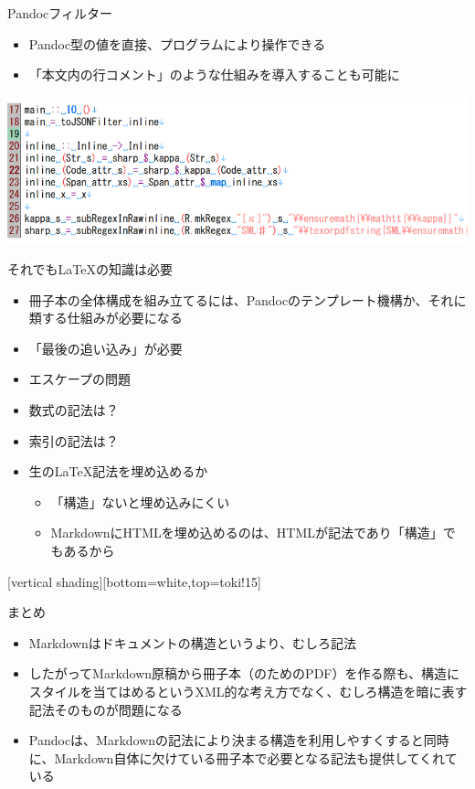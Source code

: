 \documentclass[14pt,dvipdfmx,uplatex]{beamer}
\begin{document}
\begin{frame}[t]{\inhibitglue Pandocフィルター}
  \sffamily
  \begin{itemize}
    \item Pandoc型の値を直接、プログラムにより操作できる
    \item \leavevmode\inhibitglue 「本文内の行コメント」のような仕組みを導入することも可能に
  \end{itemize}
  \begin{center}
  \includegraphics[width=.9\textwidth]{figures/filter.png}\\
  \end{center}
\end{frame}

\begin{frame}[t]{\inhibitglue それでも\LaTeX{}の知識は必要}
  \sffamily
  \begin{itemize}
    \item 冊子本の全体構成を組み立てるには、Pandocのテンプレート機構か、それに類する仕組みが必要になる
    \item \leavevmode\inhibitglue 「最後の追い込み」が必要
    \item エスケープの問題
    \item 数式の記法は？
    \item 索引の記法は？
    \item 生の\LaTeX{}記法を埋め込めるか
    \begin{itemize}
      \item 「構造」ないと埋め込みにくい
      \item MarkdownにHTMLを埋め込めるのは、HTMLが記法であり「構造」でもあるから
    \end{itemize}
  \end{itemize}
\end{frame}

[vertical shading][bottom=white,top=toki!15]

\begin{frame}[t]{\inhibitglue まとめ}
  \sffamily
  \begin{itemize}
    \item Markdownはドキュメントの構造というより、むしろ記法
    \item したがってMarkdown原稿から冊子本（のためのPDF）を作る際も、構造にスタイルを当てはめるというXML的な考え方でなく、むしろ構造を暗に表す記法そのものが問題になる
    \item Pandocは、Markdownの記法により決まる構造を利用しやすくすると同時に、Markdown自体に欠けている冊子本で必要となる記法も提供してくれている
  \end{itemize}
\end{frame}
\end{document}

